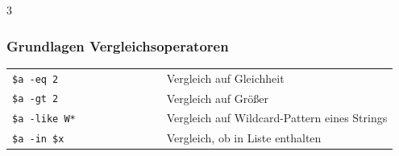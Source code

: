 \documentclass[
11pt,
footheight=40pt
]{scrartcl}
\newif\ifpipelining \pipeliningtrue
\newif \ifcomparisonoperators \comparisonoperatorstrue
\begin{document}
\begin{paracol}{3}
	\ifcomparisonoperators 
	\subsubsection*{Grundlagen Vergleichsoperatoren}
	\begin{tabular}{p{0.4\linewidth} p{0.6\linewidth}}
		\rowcolor{lightpink} \texttt{\$a -eq 2} & Vergleich auf Gleichheit \\
		 \texttt{\$a -gt 2} & Vergleich auf Größer \\
		\rowcolor{lightpink} \texttt{\$a -like \dq W*\dq} & Vergleich auf Wildcard-Pattern eines Strings \\
		 \texttt{\$a -in \$x} & Vergleich, ob in Liste enthalten \\
	\end{tabular}
	\fi
	
	\newpage
    \switchcolumn %
    	\ifpipelining 

\end{paracol}
\end{document}

